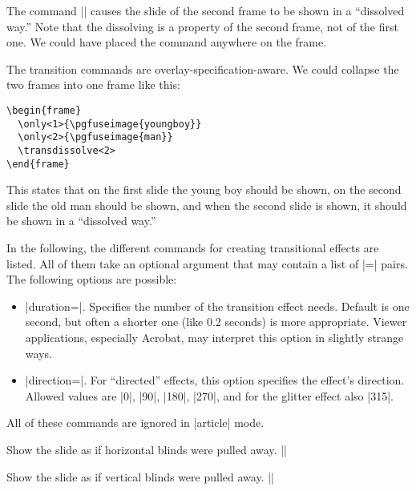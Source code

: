 The command |\transdissolve| causes the slide of the second frame to be shown in a ``dissolved way.'' Note that the dissolving is a property of the second frame, not of the first one. We could have placed the command anywhere on the frame.

The transition commands are overlay-specification-aware. We could collapse the two frames into one frame like this:

\begin{verbatim}
\begin{frame}
  \only<1>{\pgfuseimage{youngboy}}
  \only<2>{\pgfuseimage{man}}
  \transdissolve<2>
\end{frame}
\end{verbatim}

This states that on the first slide the young boy should be shown, on the second slide the old man should be shown, and when the second slide is shown, it should be shown in a ``dissolved way.''

In the following, the different commands for creating transitional effects are listed. All of them take an optional argument that may contain a list of |=| pairs. The following options are possible:

\begin{itemize}
\item
  |duration=|. Specifies the number of  the transition effect needs. Default is one second, but often a shorter one (like 0.2 seconds) is more appropriate. Viewer applications, especially Acrobat, may interpret this option in slightly strange ways.
\item
  |direction=|. For ``directed'' effects, this option specifies the effect's direction. Allowed values are |0|, |90|, |180|, |270|, and for the glitter effect also |315|.
\end{itemize}

\articlenote
All of these commands are ignored in |article| mode.

\begin{command}{\transblindshorizontal{}}
  Show the slide as if horizontal blinds were pulled away.
  \example|\transblindshorizontal|
\end{command}

\begin{command}{\transblindsvertical{}}
  Show the slide as if vertical blinds were pulled away.
  \example||
\end{command}

